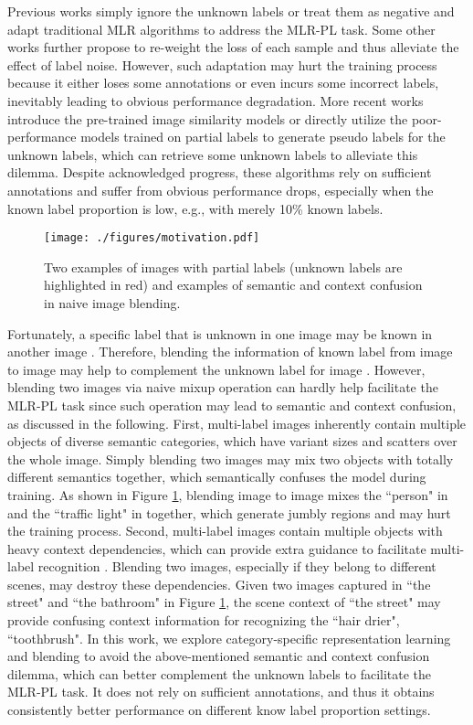 \documentclass[lettersize,journal]{IEEEtran}
\begin{document}
Previous works \cite{Sun2017ICCV, Joulin2016ECCV} simply ignore the unknown labels or treat them as negative and adapt traditional MLR algorithms to address the MLR-PL task. Some other works \cite{Kim2022LargeLoss, Pu2022MLR-PPL} further propose to re-weight the loss of each sample and thus alleviate the effect of label noise. However, such adaptation may hurt the training process because it either loses some annotations or even incurs some incorrect labels, inevitably leading to obvious performance degradation. More recent works \cite{Durand2019CVPR, Huynh2020CVPR} introduce the pre-trained image similarity models or directly utilize the poor-performance models trained on partial labels to generate pseudo labels for the unknown labels, which can retrieve some unknown labels to alleviate this dilemma. Despite acknowledged progress, these algorithms rely on sufficient annotations and suffer from obvious performance drops, especially when the known label proportion is low, e.g., with merely 10\% known labels.

\begin{figure}[!t] 
  \centering
  \texttt{[image: ./figures/motivation.pdf]}
  \caption{Two examples of images with partial labels (unknown labels are highlighted in red) and examples of semantic and context confusion in naive image blending.} 
  \label{fig:motivation}     
\end{figure}

Fortunately, a specific label  that is unknown in one image  may be known in another image . Therefore, blending the information of known label  from image  to image  may help to complement the unknown label  for image . However, blending two images via naive mixup operation \cite{Zhang2017Mixup} can hardly help facilitate the MLR-PL task since such operation may lead to semantic and context confusion, as discussed in the following. First, multi-label images inherently contain multiple objects of diverse semantic categories, which have variant sizes and scatters over the whole image. Simply blending two images may mix two objects with totally different semantics together, which semantically confuses the model during training. As shown in Figure \ref{fig:motivation}, blending image  to image  mixes the ``person" in  and the ``traffic light" in  together, which generate jumbly regions and may hurt the training process. Second, multi-label images contain multiple objects with heavy context dependencies, which can provide extra guidance to facilitate multi-label recognition \cite{Chen2019SSGRL,Chen2022KGGR}. Blending two images, especially if they belong to different scenes, may destroy these dependencies. Given two images captured in ``the street" and ``the bathroom" in Figure \ref{fig:motivation}, the scene context of ``the street" may provide confusing context information for recognizing the ``hair drier", ``toothbrush". In this work, we explore category-specific representation learning and blending to avoid the above-mentioned semantic and context confusion dilemma, which can better complement the unknown labels to facilitate the MLR-PL task. It does not rely on sufficient annotations, and thus it obtains consistently better performance on different know label proportion settings.
\end{document}
